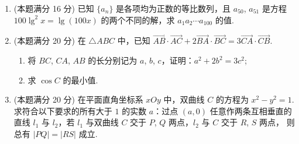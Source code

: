 \documentclass{chsmc}
\begin{document}
\begin{enumerate}[resume]
	\item (本题满分 16 分) 已知 $\{a_n\}$ 是各项均为正数的等比数列，且 $a_{50}$, $a_{51}$ 是方程
		$100\lg^2 x = \lg(100x)$ 的两个不同的解，求 $a_1a_2\cdots a_{100}$ 的值.
	\item (本题满分 20 分) 在 $\triangle ABC$ 中，已知
		$\overrightarrow{AB}\cdot\overrightarrow{AC} + 2\overrightarrow{BA}\cdot\overrightarrow{BC} = 3\overrightarrow{CA}\cdot\overrightarrow{CB}$.
		\begin{enumerate}[(1)]
			\item 将 $BC$, $CA$, $AB$ 的长分别记为 $a$, $b$, $c$，证明：$a^2 + 2b^2 = 3c^2$;
			\item 求 $\cos C$ 的最小值.
		\end{enumerate}
	\item (本题满分 20 分) 在平面直角坐标系 $xOy$ 中，双曲线 $C$ 的方程为 $x^2 - y^2 = 1$.
		求符合以下要求的所有大于 $1$ 的实数 $a$：过点 $(a,0)$ 任意作两条互相垂直的直线
		$l_1$ 与 $l_2$，若 $l_1$ 与双曲线 $C$ 交于 $P$, $Q$ 两点，$l_2$ 与 $C$ 交于 $R$, $S$ 两点，
		则总有 $|PQ| = |RS|$ 成立.
\end{enumerate}
\end{document}
